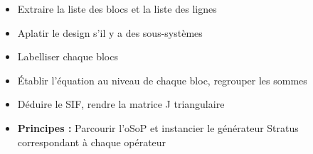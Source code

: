 \begin{frame} 
	\begin{center}
	\end{center}
\begin{itemize}
	\pause
	\item Extraire la liste des blocs et la liste des lignes
	\pause
	\item Aplatir le design s'il y a des sous-systèmes
	\pause
	\item Labelliser chaque blocs
	\pause
	\item Établir l'équation au niveau de chaque bloc, regrouper les sommes
	\pause
	\item Déduire le SIF, rendre la matrice J triangulaire
\end{itemize}
\end{frame}

\begin{frame} 
\begin{itemize}
\item \textbf{Principes : } Parcourir l'oSoP et instancier le générateur Stratus correspondant à chaque opérateur
	\bigskip	
	\begin{center}
	\end{center}
\end{itemize}
\end{frame}

\begin{frame} 
	\begin{center}
	\end{center}
\end{frame}
